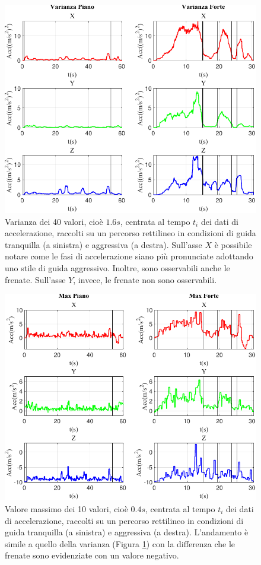 \documentclass[class=article]{standalone}
\begin{document}
	\newpage

	\begin{center}
		\begin{figure}[h!]
			\centering\includegraphics[width=.7\textwidth]{img/lungaFP/Acc/Varianza}
			\caption[]{Varianza dei 40 valori, cioè \(1.6s\), centrata al tempo \(t_{i}\) dei dati di accelerazione, raccolti su un percorso rettilineo in condizioni di guida tranquilla (a sinistra) e aggressiva (a destra). Sull'asse \(X\) è possibile notare come le fasi di accelerazione siano più pronunciate adottando uno stile di guida aggressivo. Inoltre, sono osservabili anche le frenate. Sull'asse \(Y\), invece, le frenate non sono osservabili.}
			\label{fig:AccVar_lungaFP}
		\end{figure}
	\end{center}
	
	\begin{center}
		\begin{figure}[h!]
			\centering\includegraphics[width=.7\textwidth]{img/lungaFP/Acc/Max}
			\caption[]{Valore massimo dei 10 valori, cioè \(0.4s\), centrata al tempo \(t_{i}\) dei dati di accelerazione, raccolti su un percorso rettilineo in condizioni di guida tranquilla (a sinistra) e aggressiva (a destra). L'andamento è simile a quello della varianza (Figura \ref{fig:AccVar_lungaFP}) con la differenza che le frenate sono evidenziate con un valore negativo.}
			\label{fig:AccMax_lungaFP}
		\end{figure}
	\end{center}
	
\end{document}
